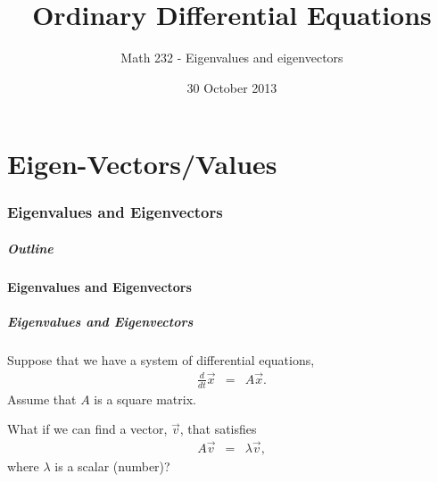 \part{Eigen-Vectors/Values}
\section{Eigenvalues and Eigenvectors}


\title{Ordinary Differential Equations}
\subtitle{Math 232 - Eigenvalues and eigenvectors}
\date{30 October 2013}

\begin{frame}
  \titlepage
\end{frame}

\begin{frame}
  \frametitle{Outline}
  \tableofcontents[currentsection]
\end{frame}


\subsection{Eigenvalues and Eigenvectors}


\begin{frame}
  \frametitle{Eigenvalues and Eigenvectors}

  Suppose that we have a system of differential equations,
  \begin{eqnarray*}
    \frac{d}{dt} \vec{x} & = & A \vec{x}.
  \end{eqnarray*}
  Assume that $A$ is a square matrix.

  What if we can find a vector, $\vec{v}$, that satisfies
  \begin{eqnarray*}
    A \vec{v} & = & \lambda \vec{v},
  \end{eqnarray*}
  where $\lambda$ is a scalar (number)?

\end{frame}


